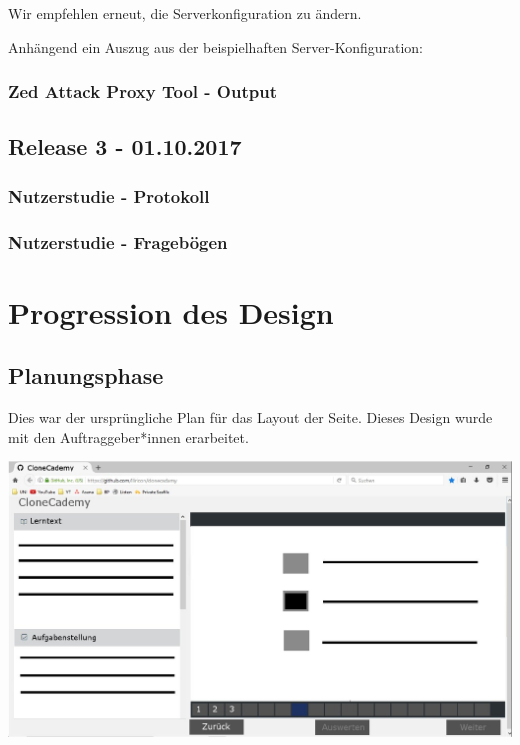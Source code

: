 \documentclass[accentcolor=tud0b,12pt,paper=a4]{tudreport}
\begin{document}
	Wir empfehlen erneut, die Serverkonfiguration zu ändern.

	Anhängend ein Auszug aus der beispielhaften Server-Konfiguration:

	

	\subsection*{Zed Attack Proxy Tool - Output}
	


\section{Release 3 - 01.10.2017}

	\subsection*{Nutzerstudie - Protokoll}
	

	\subsection*{Nutzerstudie - Fragebögen}

\chapter{Progression des Design}

	\section*{Planungsphase}
	Dies war der ursprüngliche Plan für das Layout der Seite. Dieses Design wurde mit den Auftraggeber*innen erarbeitet.

	\includegraphics[height=0.3\textheight]{appendix/bilder/design_example_1-0.jpg}
\end{document}

